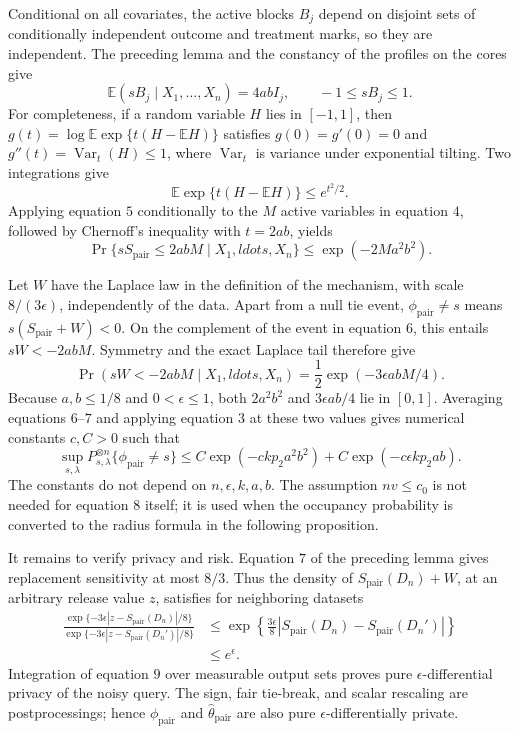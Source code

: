 Conditional on all covariates, the active blocks \(B_j\) depend on disjoint sets of conditionally independent outcome and treatment marks, so they are independent.  The preceding lemma and the constancy of the profiles on the cores give
\[
 \mathbb E(sB_j\mid X_1,\ldots,X_n)=4abI_j,
 \qquad -1\le sB_j\le1. \tag{4}
\]
For completeness, if a random variable \(H\) lies in \([-1,1]\), then
\(g(t)=\log\mathbb E\exp\{t(H-\mathbb EH)\}\) satisfies \(g(0)=g'(0)=0\) and \(g''(t)=\operatorname{Var}_t(H)\le1\), where \(\operatorname{Var}_t\) is variance under exponential tilting.  Two integrations give
\[
 \mathbb E\exp\{t(H-\mathbb EH)\}\le e^{t^2/2}. \tag{5}
\]
Applying equation \(5\) conditionally to the \(M\) active variables in equation \(4\), followed by Chernoff's inequality with \(t=2ab\), yields
\[
 \Pr\{sS_{\mathrm{pair}}\le2abM\mid X_1,ldots,X_n\}
 \le\exp(-2Ma^2b^2). \tag{6}
\]

Let \(W\) have the Laplace law in the definition of the mechanism, with scale \(8/(3\epsilon)\), independently of the data.  Apart from a null tie event, \(\phi_{\mathrm{pair}}\ne s\) means \(s(S_{\mathrm{pair}}+W)<0\).  On the complement of the event in equation \(6\), this entails \(sW<-2abM\).  Symmetry and the exact Laplace tail therefore give
\[
 \Pr(sW<-2abM\mid X_1,ldots,X_n)
 =\frac12\exp(-3\epsilon abM/4). \tag{7}
\]
Because \(a,b\le1/8\) and \(0<\epsilon\le1\), both \(2a^2b^2\) and \(3\epsilon ab/4\) lie in \([0,1]\).  Averaging equations \(6\)--\(7\) and applying equation \(3\) at these two values gives numerical constants \(c,C>0\) such that
\[
 \sup_{s,\lambda}P_{s,\lambda}^{\otimes n}
 \{\phi_{\mathrm{pair}}\ne s\}
 \le C\exp(-ckp_2a^2b^2)
      +C\exp(-c\epsilon kp_2ab). \tag{8}
\]
The constants do not depend on \(n,\epsilon,k,a,b\).  The assumption \(nv\le c_0\) is not needed for equation \(8\) itself; it is used when the occupancy probability is converted to the radius formula in the following proposition.

It remains to verify privacy and risk.  Equation \(7\) of the preceding lemma gives replacement sensitivity at most \(8/3\).  Thus the density of \(S_{\mathrm{pair}}(D_n)+W\), at an arbitrary release value \(z\), satisfies for neighboring datasets
\[
 \begin{aligned}
 \frac{\exp\{-3\epsilon|z-S_{\mathrm{pair}}(D_n)|/8\}}
      {\exp\{-3\epsilon|z-S_{\mathrm{pair}}(D_n')|/8\}}
 &\le
 \exp\left\{\frac{3\epsilon}{8}
 |S_{\mathrm{pair}}(D_n)-S_{\mathrm{pair}}(D_n')|\right\}\\
 &\le e^\epsilon. \tag{9}
 \end{aligned}
\]
Integration of equation \(9\) over measurable output sets proves pure \(\epsilon\)-differential privacy of the noisy query.  The sign, fair tie-break, and scalar rescaling are postprocessings; hence \(\phi_{\mathrm{pair}}\) and \(\widehat\theta_{\mathrm{pair}}\) are also pure \(\epsilon\)-differentially private.

